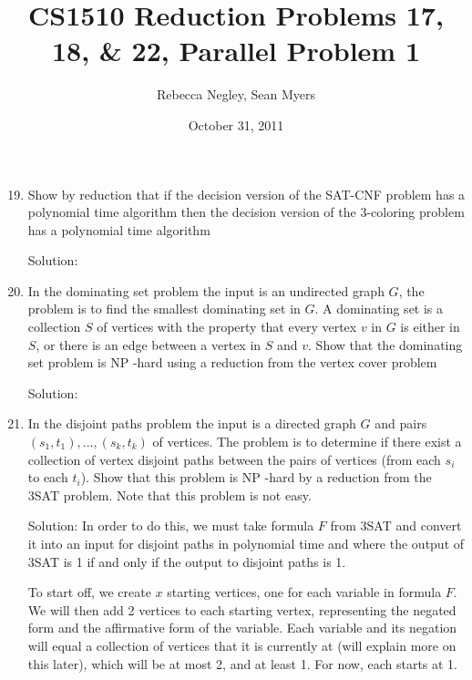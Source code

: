\documentclass{article}
\title{CS1510  Reduction Problems 17, 18, \& 22, Parallel Problem 1}
\author{Rebecca Negley, Sean Myers}
\date{October 31, 2011}
\begin{document}
\maketitle

\begin{enumerate}
\setcounter{enumi}{18}
\item  Show by reduction that if the decision version of the SAT-CNF problem has a polynomial time algorithm
\newline then the decision version of the 3-coloring problem has a polynomial time algorithm
\newline

Solution:
\newline
\item In the dominating set problem the input is an undirected graph $G$, the problem is to find the smallest
\newline dominating set in $G$. A dominating set is a collection $S$ of vertices with the property that every vertex
\newline $v$ in $G$ is either in $S$, or there is an edge between a vertex in $S$ and $v$. Show that the dominating set
\newline problem is NP -hard using a reduction from the vertex cover problem
\newline

Solution:
\newline
\setcounter{enumi}{22}
\item  In the disjoint paths problem the input is a directed graph $G$ and pairs $(s_1, t_1), ..., (s_k, t_k)$ of vertices.
\newline The problem is to determine if there exist a collection of vertex disjoint paths between the pairs of
\newline vertices (from each $s_i$ to each $t_i$). Show that this problem is NP -hard by a reduction from the 3SAT
\newline problem. Note that this problem is not easy.
\newline

Solution: In order to do this, we must take formula $F$ from 3SAT and convert it into an input for disjoint paths in polynomial time and where the output of 3SAT is 1 if and only if the output to disjoint paths is 1.

To start off, we create $x$ starting vertices, one for each variable in formula $F$. We will then add 2 vertices to each starting vertex, representing the negated form and the affirmative form of the variable. Each variable and its negation will equal a collection of vertices that it is currently at (will explain more on this later), which will be at most 2, and at least 1. For now, each starts at 1.


\end{enumerate}
\end{document}
